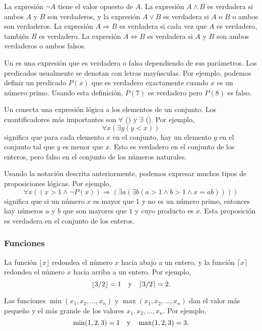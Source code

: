 La expresi\'on $\lnot A$ tiene el valor opuesto de $A$.
La expresi\'on $A \land B$ es verdadera si ambos $A$ y $B$
son verdaderos,
y la expresi\'on $A \lor B$ es verdadera si $A$ o $B$ o ambos
son verdaderos.
La expresi\'on $A \Rightarrow B$ es verdadera
si cada vez que $A$ es verdadero, tambi\'en $B$ es verdadero.
La expresi\'on $A \Leftrightarrow B$ es verdadera
si $A$ y $B$ son ambos verdaderos o ambos falsos.


Un  es una expresi\'on que es verdadera o falsa
dependiendo de sus par\'ametros.
Los predicados usualmente se denotan con letras may\'usculas.
Por ejemplo, podemos definir un predicado $P(x)$
que es verdadero exactamente cuando $x$ es un n\'umero primo.
Usando esta definici\'on, $P(7)$ es verdadero pero $P(8)$ es falso.


Un  conecta una expresi\'on l\'ogica
a los elementos de un conjunto.
Los cuantificadores m\'as importantes son
$\forall$ () y $\exists$ ().
Por ejemplo,
\[\forall x (\exists y (y < x))\]
significa que para cada elemento $x$ en el conjunto,
hay un elemento $y$ en el conjunto
tal que $y$ es menor que $x$.
Esto es verdadero en el conjunto de los enteros,
pero falso en el conjunto de los n\'umeros naturales.

Usando la notaci\'on descrita anteriormente,
podemos expresar muchos tipos de proposiciones l\'ogicas.
Por ejemplo,
\[\forall x ((x>1 \land \lnot P(x)) \Rightarrow (\exists a (\exists b (a > 1 \land b > 1 \land x = ab))))\]
significa que si un n\'umero $x$ es mayor que 1
y no es un n\'umero primo,
entonces hay n\'umeros $a$ y $b$
que son mayores que $1$ y cuyo producto es $x$.
Esta proposici\'on es verdadera en el conjunto de los enteros.

\subsubsection{Funciones}

La funci\'on $\lfloor x \rfloor$ redondea el n\'umero $x$
hacia abajo a un entero, y la funci\'on
$\lceil x \rceil$ redondea el n\'umero $x$
hacia arriba a un entero. Por ejemplo,
\[ \lfloor 3/2 \rfloor = 1 \hspace{10px} \textrm{y} \hspace{10px} \lceil 3/2 \rceil = 2.\]

Las funciones $\min(x_1,x_2,\ldots,x_n)$
y $\max(x_1,x_2,\ldots,x_n)$
dan el valor m\'as peque\~no y el m\'as grande de los valores
$x_1,x_2,\ldots,x_n$.
Por ejemplo,
\[ \min(1,2,3)=1 \hspace{10px} \textrm{y} \hspace{10px} \max(1,2,3)=3.\]

